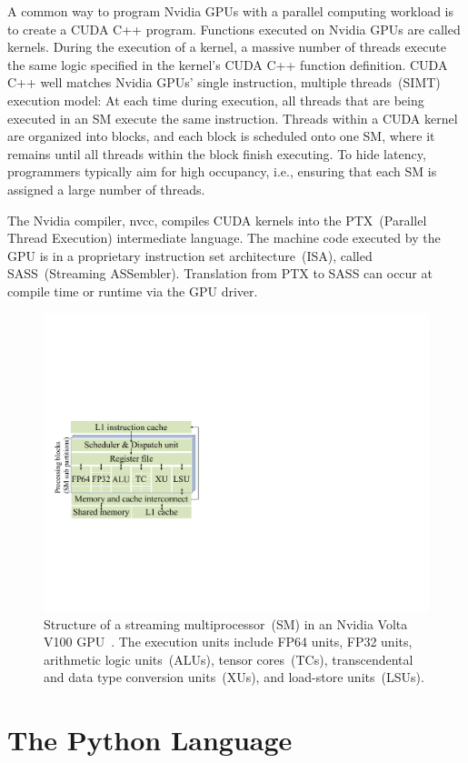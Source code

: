 A common way to program Nvidia GPUs with a parallel computing workload is to create a CUDA C++ program. Functions executed on Nvidia GPUs are called kernels. During the execution of a kernel, a massive number of threads execute the same logic specified in the kernel's CUDA C++ function definition. CUDA C++ well matches Nvidia GPUs' single instruction, multiple threads~(SIMT) execution model: At each time during execution, all threads that are being executed in an SM execute the same instruction. Threads within a CUDA kernel are organized into blocks, and each block is scheduled onto one SM, where it remains until all threads within the block finish executing. To hide latency, programmers typically aim for high occupancy, i.e., ensuring that each SM is assigned a large number of threads.


The Nvidia compiler, nvcc, compiles CUDA kernels into the PTX~(Parallel Thread Execution) intermediate language. The machine code executed by the GPU is in a proprietary instruction set architecture~(ISA), called SASS~(Streaming ASSembler). Translation from PTX to SASS can occur at compile time or runtime via the GPU driver.


\begin{figure}[]
    \centering
    \includegraphics[width=0.45\linewidth]{figures/Intro/sm_arch.pdf}
    \caption{Structure of a streaming multiprocessor~(SM) in an Nvidia Volta V100 GPU~\cite{V100Whitepaper,jiaDissectingNVIDIAVolta2018,nickollsInstructionsManagingParallel2019,davidm.koppelmanEE7722GPU2023,nvidiaKernelProfilingGuide2024}. The execution units include FP64 units, FP32 units, arithmetic logic units~(ALUs), tensor cores~(TCs), transcendental and data type conversion units~(XUs), and load-store units~(LSUs). }
    \label{fig:sm_arch}
\end{figure}


\section{The Python Language}
\label{sec:bg_python}


